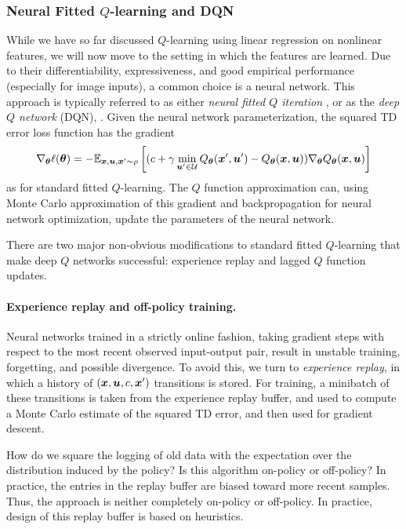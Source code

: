 \subsubsection{Neural Fitted $Q$-learning and DQN}

While we have so far discussed $Q$-learning using linear regression on nonlinear features, we will now move to the setting in which the features are learned. Due to their differentiability, expressiveness, and good empirical performance (especially for image inputs), a common choice is a neural network. This approach is typically referred to as either \textit{neural fitted $Q$ iteration} \cite{riedmiller2005neural}, or as the \textit{deep $Q$ network} (DQN), \cite{mnih2015human}. Given the neural network parameterization, the squared TD error loss function has the gradient
\begin{equation}
    \nabla_{\bm{\theta}} \ell(\bm{\theta}) = - \mathbb{E}_{\bm{x},\bm{u},\bm{x}'\sim \rho}\left[ (c + \gamma \min_{\bm{u}' \in \mathcal{U}} Q_{\bm{\theta}}(\bm{x}',\bm{u}') - Q_{\bm{\theta}}(\bm{x},\bm{u})) \nabla_{\bm{\theta}} Q_{\bm{\theta}}(\bm{x},\bm{u}) \right]
\end{equation}
as for standard fitted $Q$-learning. The $Q$ function approximation can, using Monte Carlo approximation of this gradient and backpropagation for neural network optimization, update the parameters of the neural network. 

There are two major non-obvious modifications to standard fitted $Q$-learning that make deep $Q$ networks successful: experience replay \cite{lin1993reinforcement} and lagged $Q$ function updates.


\paragraph{Experience replay and off-policy training.} 
Neural networks trained in a strictly online fashion, taking gradient steps with respect to the most recent observed input-output pair, result in unstable training, forgetting, and possible divergence. To avoid this, we turn to \textit{experience replay}, in which a history of $(\bm{x}, \bm{u}, c, \bm{x}')$ transitions is stored. For training, a minibatch of these transitions is taken from the experience replay buffer, and used to compute a Monte Carlo estimate of the squared TD error, and then used for gradient descent. 

How do we square the logging of old data with the expectation over the distribution induced by the policy? Is this algorithm on-policy or off-policy? In practice, the entries in the replay buffer are biased toward more recent samples. Thus, the approach is neither completely on-policy or off-policy. In practice, design of this replay buffer is based on heuristics.

